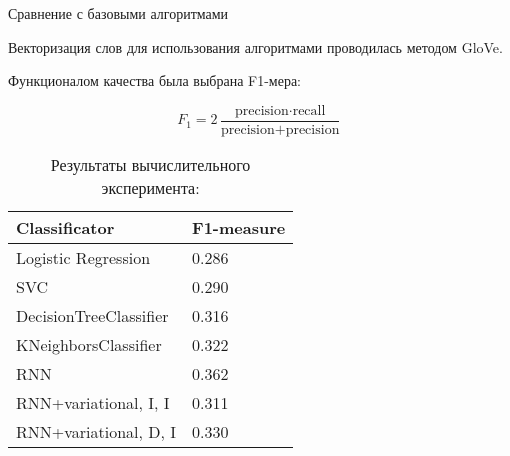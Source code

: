 \documentclass{beamer}
\begin{document}
\begin{frame}{Сравнение с базовыми алгоритмами}

Векторизация слов для использования алгоритмами проводилась методом GloVe.

Функционалом качества была выбрана F1-мера:

$$F_1 = 2 \frac{\text{precision} \cdot \text{recall}}{\text{precision} + \text{precision}}$$


\vspace{-0.5cm}

\begin{table}[H]
	\centering
	\caption*{Результаты вычислительного эксперимента:}
	\label{my-label1}
	\begin{tabular}{|l|l|}
		\hline
		Classificator          & F1-measure \\ \hline
		Logistic Regression    & 0.286      \\ \hline
		SVC                    & 0.290      \\ \hline
		DecisionTreeClassifier & 0.316      \\ \hline
		KNeighborsClassifier   & 0.322      \\ \hline
		RNN                    & 0.362      \\ \hline
		RNN+variational, I, I  & 0.311      \\ \hline
		RNN+variational, D, I  & 0.330      \\ \hline
	\end{tabular}
\end{table}

\end{frame}

%
%
%
\end{document}
